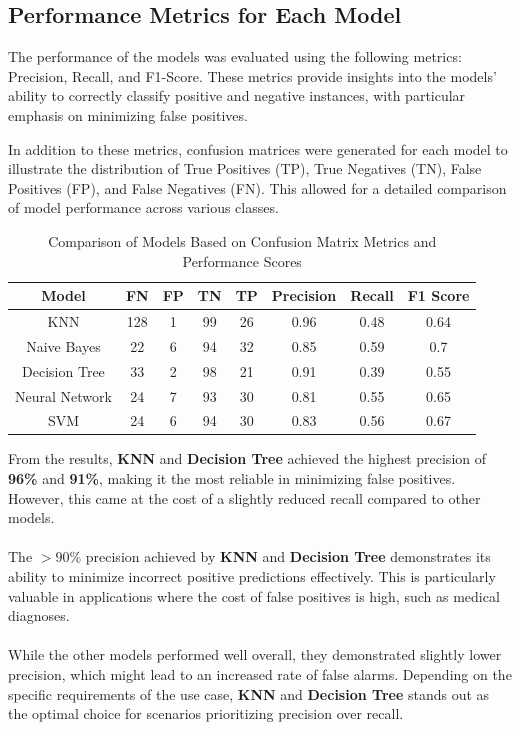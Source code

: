 \documentclass[a4paper,12pt]{article}
\begin{document}
\subsection{Performance Metrics for Each Model}
The performance of the models was evaluated using the following metrics: Precision, Recall, and F1-Score. These metrics provide insights into the models' ability to correctly classify positive and negative instances, with particular emphasis on minimizing false positives.

In addition to these metrics, confusion matrices were generated for each model to illustrate the distribution of True Positives (TP), True Negatives (TN), False Positives (FP), and False Negatives (FN). This allowed for a detailed comparison of model performance across various classes.
\newpage

\begin{table}[h!]
\centering
\begin{tabular}{|c|c|c|c|c|c|c|c|}
\hline
\textbf{Model} & \textbf{FN} & \textbf{FP} & \textbf{TN} & \textbf{TP} & \textbf{Precision} & \textbf{Recall} & \textbf{F1 Score} \\ \hline
KNN              & 128         & 1           & 99          & 26          & 0.96               & 0.48            & 0.64              \\ \hline
Naive Bayes      & 22          & 6           & 94          & 32          & 0.85               & 0.59            & 0.7               \\ \hline
Decision Tree    & 33          & 2           & 98          & 21          & 0.91               & 0.39            & 0.55              \\ \hline
Neural Network   & 24          & 7           & 93          & 30          & 0.81               & 0.55            & 0.65              \\ \hline
SVM              & 24          & 6           & 94          & 30          & 0.83               & 0.56            & 0.67              \\ \hline
\end{tabular}
\caption{Comparison of Models Based on Confusion Matrix Metrics and Performance Scores}
\end{table}
From the results, \textbf{KNN} and \textbf{Decision Tree} achieved the highest precision of \textbf{96\%} and \textbf{91\%}, making it the most reliable in minimizing false positives. However, this came at the cost of a slightly reduced recall compared to other models.\\\\
The \(>90\%\) precision achieved by \textbf{KNN} and \textbf{Decision Tree} demonstrates its ability to minimize incorrect positive predictions effectively. This is particularly valuable in applications where the cost of false positives is high, such as medical diagnoses.\\\\
While the other models performed well overall, they demonstrated slightly lower precision, which might lead to an increased rate of false alarms. Depending on the specific requirements of the use case, \textbf{KNN} and \textbf{Decision Tree} stands out as the optimal choice for scenarios prioritizing precision over recall.
\end{document}

